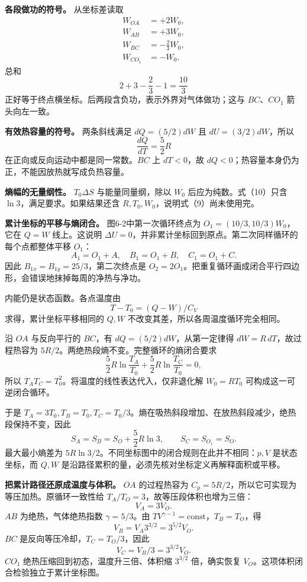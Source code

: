 \documentclass[12pt,a4paper,UTF8]{ctexart}
\begin{document}
\textbf{各段做功的符号。} 从坐标差读取 \[
\begin{aligned}
W_{OA}&=+2W_0,\\
W_{AB}&=+3W_0,\\
W_{BC}&=-\frac23W_0,\\
W_{CO_1}&=-W_0.
\end{aligned}
\] 总和 \[
2+3-\frac23-1=\frac{10}{3}
\] 正好等于终点横坐标。后两段含负功，表示外界对气体做功；这与
\(BC\)、\(CO_1\) 箭头向左一致。

\textbf{有效热容量的符号。} 两条斜线满足 \(dQ=(5/2)dW\) 且
\(dU=(3/2)dW\)，所以 \[
\frac{dQ}{dT}=\frac52R
\] 在正向或反向运动中都是同一常数。\(BC\) 上 \(dT<0\)，故
\(dQ<0\)；热容量本身仍为正，不能因放热就写成负热容量。

\textbf{熵幅的无量纲性。} \(T_0\Delta S\) 与能量同量纲，除以 \(W_0\)
后应为纯数。式（10）只含 \(\ln3\)，满足要求。如果结果还含
\(R,T_0,W_0\)，说明式（9）尚未使用完。

\textbf{累计坐标的平移与熵闭合。} 图6-2中第一次循环终点为
\(O_1=(10/3,10/3)W_0\)，它在 \(Q=W\) 线上。这说明
\(\Delta U=0\)，并非累计坐标回到原点。第二次同样循环的每个点都整体平移
\(O_1\)： \[
A_1=O_1+A,\quad B_1=O_1+B,\quad C_1=O_1+C.
\] 因此 \(B_{1x}=B_{1y}=25/3\)，第二次终点是
\(O_2=2O_1\)。把重复循环画成闭合平行四边形，会错误地抹掉每周的净热与净功。

内能仍是状态函数。各点温度由 \[
T-T_0=(Q-W)/C_V
\] 求得，累计坐标平移相同的 \(Q,W\)
不改变其差，所以各周温度循环完全相同。

沿 \(OA\) 与反向平行的 \(BC\)，有 \(dQ=(5/2)dW\)，从第一定律得
\(dW=R\,dT\)，故过程热容为
\(5R/2\)。两绝热段熵不变。完整循环的熵闭合要求 \[
\frac52R\ln\frac{T_A}{T_0}+\frac52R\ln\frac{T_C}{T_0}=0,
\] 所以 \(T_AT_C=T_0^2\)。将温度的线性表达代入，仅非退化解 \(W_0=RT_0\)
可构成这一可逆闭合循环。

于是
\(T_A=3T_0,T_B=T_0,T_C=T_0/3\)。熵在吸热斜段增加、在放热斜段减少，绝热段保持不变，因此
\[
S_A=S_B=S_O+\frac52R\ln3,
\qquad S_C=S_{O_1}=S_O.
\] 最大最小熵差为
\(5R\ln3/2\)。不同坐标图中的闭合规则在此并不相同：\(p,V\) 是状态坐标，而
\(Q,W\) 是沿路径累积的量，必须先核对坐标定义再解释面积或平移。

\textbf{把累计路径还原成温度与体积。} \(OA\) 的过程热容为
\(C_p=5R/2\)，所以它可实现为等压加热。原循环一致性给
\(T_A/T_O=3\)，故等压段体积也增为三倍： \[
V_A=3V_O.
\] \(AB\) 为绝热，气体绝热指数 \(\gamma=5/3\)。由
\(TV^{\gamma-1}=\mathrm{const}\)，\(T_B=T_O\)，得 \[
V_B=V_A3^{3/2}=3^{5/2}V_O.
\] \(BC\) 是反向等压冷却，\(T_C=T_O/3\)，因此 \[
V_C=V_B/3=3^{3/2}V_O.
\] \(CO_1\) 绝热压缩回到初态，温度升三倍、体积缩 \(3^{3/2}\)
倍，确实恢复 \(V_O\)。这项体积闭合检验独立于累计坐标图。
\end{document}
